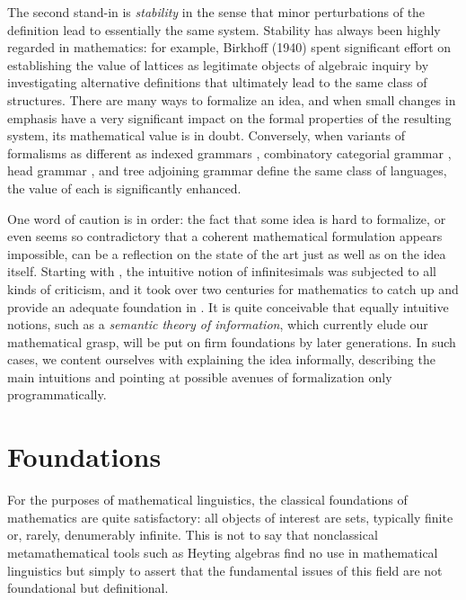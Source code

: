 The second stand-in is {\it stability} in the sense that minor perturbations
of the definition lead to essentially the same system. Stability has always
been highly regarded in mathematics: for example, Birkhoff (1940) spent
significant effort on establishing the value of lattices as legitimate objects
of algebraic inquiry by investigating alternative definitions that ultimately
lead to the same class of structures. There are many ways to formalize an
idea, and when small changes in emphasis have a very significant impact on the
formal properties of the resulting system, its mathematical value is in doubt.
Conversely, when variants of formalisms as different as indexed grammars
\cite{Aho:1968}, combinatory categorial grammar \cite{Steedman:2001}, head
grammar \cite{Pollard:1984}, and tree adjoining grammar \cite{Joshi:2003}
define the same class of languages, the value of each is significantly
enhanced.
\nocite{Birkhoff:1940}

One word of caution is in order: the fact that some idea is hard to formalize,
or even seems so contradictory that a coherent mathematical formulation
appears impossible, can be a reflection on the state of the art just as well
as on the idea itself.  Starting with , the intuitive
notion of infinitesimals was subjected to all kinds of criticism, and it took
over two centuries for mathematics to catch up and provide an adequate
foundation in . It is quite conceivable that equally
intuitive notions, such as a {\sl semantic theory of information}, which
currently elude our mathematical grasp, will be put on firm foundations by
later generations.  In such cases, we content ourselves with explaining the
idea informally, describing the main intuitions and pointing at possible
avenues of formalization only programmatically.  

\section{Foundations}

For the purposes of mathematical linguistics, the classical foundations of
mathematics are quite satisfactory: all objects of interest are sets,
typically finite or, rarely, denumerably infinite. This is not to say that
nonclassical metamathematical tools such as Heyting algebras find no use in
mathematical linguistics but simply to assert that the
fundamental issues of this field are not foundational but definitional. 

